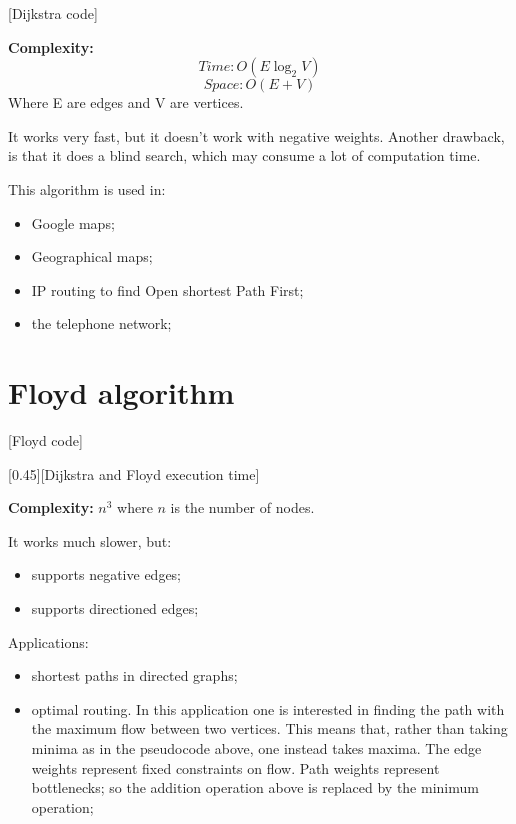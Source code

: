 \documentclass{article}
\begin{document}
		\begin{minipage}{\textwidth}
			[Dijkstra code]
		\end{minipage}

		\begin{center}
			\textbf{Complexity:}
			\[
				Time: O(E\log_2V)
			\]
			\[
				Space: O(E + V)
			\]
			Where E are edges and V are vertices.
		\end{center}

		\par It works very fast, but it doesn't work with negative weights. Another drawback, is that it does a blind search, which may consume a lot of computation time.
		\par This algorithm is used in:
		\begin{itemize}
			\item Google maps;
			\item Geographical maps;
			\item IP routing to find Open shortest Path First;
			\item the telephone network;
		\end{itemize}

	\section{Floyd algorithm}
		\begin{minipage}{\textwidth}
			[Floyd code]
		\end{minipage}

		\def \secondGraphName {Dijkstra and Floyd execution time}
		[\secondGraphName]

		\par \textbf{Complexity: } \( n^3 \) where $n$ is the number of nodes.

		\par It works much slower, but:
		\begin{itemize}
			\item supports negative edges;
			\item supports directioned edges;
		\end{itemize}

		\par Applications:
		\begin{itemize}
			\item shortest paths in directed graphs;
			\item optimal routing. In this application one is interested in finding the path with the maximum flow between two vertices. This means that, rather than taking minima as in the pseudocode above, one instead takes maxima. The edge weights represent fixed constraints on flow. Path weights represent bottlenecks; so the addition operation above is replaced by the minimum operation;
		\end{itemize}
\end{document}

